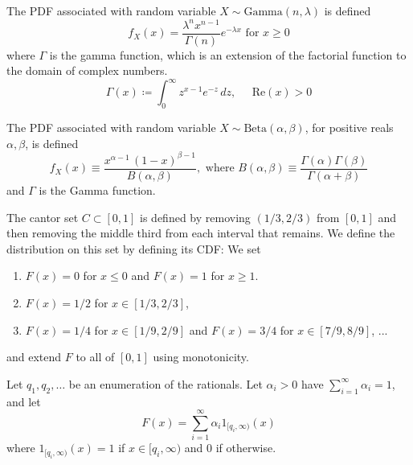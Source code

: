     \begin{example}
      The PDF associated with random variable $X \sim \mathrm{Gamma}(n, \lambda)$ is defined 
      \begin{equation}
        f_X(x) = \frac{\lambda^n x^{n-1}}{\Gamma(n)} e^{-\lambda x} \text{ for } x \geq 0
      \end{equation}
      where $\Gamma$ is the gamma function, which is an extension of the factorial function to the domain of complex numbers. 
      \begin{equation}
        \Gamma(x) \coloneqq \int_{0}^\infty z^{x-1} e^{-z}\, dz, \;\;\;\;\; \text{Re}(x) > 0
      \end{equation}
    \end{example}

    \begin{example}
      The PDF associated with random variable $X \sim \mathrm{Beta}(\alpha, \beta)$, for positive reals $\alpha, \beta$, is defined 
      \begin{equation}
        f_X (x) \equiv \frac{x^{\alpha-1} \,(1-x)^{\beta-1}}{B(\alpha, \beta)}, \text{ where } B(\alpha, \beta) \equiv \frac{\Gamma(\alpha) \Gamma(\beta)}{\Gamma(\alpha + \beta)}
      \end{equation}
      and $\Gamma$ is the Gamma function. 
    \end{example}

    \begin{example}
      The cantor set $C \subset [0, 1]$ is defined by removing $(1/3, 2/3)$ from $[0, 1]$ and then removing the middle third from each interval that remains. We define the distribution on this set by defining its CDF: We set 
      \begin{enumerate}
        \item $F(x) = 0$ for $x \leq 0$ and $F(x) = 1$ for $x \geq 1$. 
        \item $F(x) = 1/2$ for $x \in [1/3, 2/3]$, 
        \item $F(x) = 1/4$ for $x \in [1/9, 2/9]$ and $F(x) = 3/4$ for $x \in [7/9, 8/9]$, ... 
      \end{enumerate}
      and extend $F$ to all of $[0 ,1]$ using monotonicity. 
    \end{example} 

    \begin{example}
      Let $q_1, q_2, \ldots$ be an enumeration of the rationals. Let $\alpha_i > 0$ have $\sum_{i=1}^\infty \alpha_i = 1$, and let 
      \begin{equation}
        F(x) = \sum_{i=1}^\infty \alpha_i 1_{[q_i, \infty)} (x)
      \end{equation}
      where $1_{[q_i, \infty)} (x) = 1$ if $x \in [q_i, \infty)$ and $0$ if otherwise. 
    \end{example}

